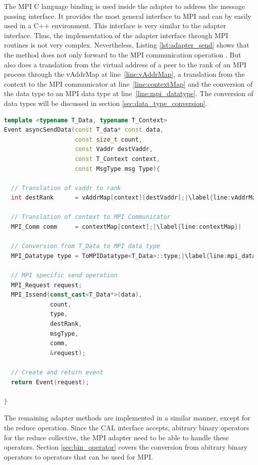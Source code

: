 The MPI C language binding is used inside the adapter to address the
message passing interface.  It provides the most general interface to
MPI and can by easily used in a C++ environment.  This interface is
very similar to the adapter interface. Thus, the implementation of the
adapter interface through MPI routines is not very
complex. Nevertheless, Listing \ref{lst:adapter_send} shows that the
 method does not only forward to the MPI
communication operation .  But also does a translation
from the virtual address  of a peer to the rank of an
MPI process through the vAddrMap at line~\ref{line:vAddrMap}, a
translation from the context to the MPI communicator at
line~\ref{line:contextMap} and the conversion of the data type
 to an MPI data type at line~\ref{line:mpi_datatype}.  The
conversion of data types will be discussed in section
\ref{sec:data_type_conversion}.


\begin{lstlisting}[language=C++, breaklines=false, label={lst:adapter_send},escapechar=|]
template <typename T_Data, typename T_Context>      
Event asyncSendData(const T_data* const data, 
                    const size_t count, 
                    const Vaddr destVaddr, 
                    const T_Context context, 
                    const MsgType msg Type){    

  // Translation of vaddr to rank
  int destRank      = vAddrMap[context][destVaddr];|\label{line:vAddrMap}|

  // Translation of context to MPI Communicator
  MPI_Comm comm     = contextMap[context];|\label{line:contextMap}|

  // Conversion from T_Data to MPI data type
  MPI_Datatype type = ToMPIDatatype<T_Data>::type;|\label{line:mpi_datatype}|

  // MPI specific send operation                                                                            
  MPI_Request request; 
  MPI_Issend(const_cast<T_Data*>(data), 
             count, 
             type,
             destRank, 
             msgType,
             comm,
             &request);

  // Create and return event
  return Event(request);                                                                                                       

}  
\end{lstlisting}

The remaining adapter methods are implemented in a similar manner,
except for the reduce operation. Since the CAL interface accepts,
abitrary binary operators for the reduce collective, the MPI
adapter need to be able to handle these operators. Section
\ref{sec:bin_operator} covers the conversion from abitrary
binary operators to operators that can be used for MPI.


